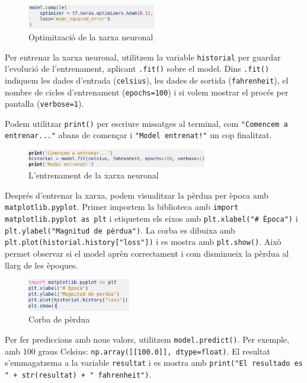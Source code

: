 \begin{figure}[H]
\centering
\includegraphics[width=0.5\textwidth]{./figures/4.png}
\caption{Optimització de la xarxa neuronal}
\end{figure}

Per entrenar la xarxa neuronal, utilitzem la variable \texttt{historial} per guardar l’evolució de l’entrenament, aplicant \texttt{.fit()} sobre el model. Dins \texttt{.fit()} indiquem les dades d’entrada (\texttt{celsius}), les dades de sortida (\texttt{fahrenheit}), el nombre de cicles d’entrenament (\texttt{epochs=100}) i si volem mostrar el procés per pantalla (\texttt{verbose=1}).

Podem utilitzar \texttt{print()} per escriure missatges al terminal, com \texttt{"\hspace{0truecm}Comencem a entrenar..."} abans de començar i \texttt{"Model entrenat!"} un cop finalitzat.

\begin{figure}[H]
\centering
\includegraphics[width=0.7\textwidth]{./figures/6.png}
\caption{L’entrenament de la xarxa neuronal}
\end{figure}

Després d’entrenar la xarxa, podem visualitzar la pèrdua per època amb \texttt{matplotlib.pyplot}. Primer importem la biblioteca amb \texttt{import matplotlib.pyplot as plt} i etiquetem els eixos amb \texttt{plt.xlabel("\# Època")} i \texttt{plt.ylabel("Magnitud de pèrdua")}. La corba es dibuixa amb \texttt{plt.plot(historial.history["loss"])} i es mostra amb \texttt{plt.show()}. Això permet observar si el model aprèn correctament i com disminueix la pèrdua al llarg de les èpoques.

\begin{figure}[H]
\centering
\includegraphics[width=0.4\textwidth]{./figures/7.png}
\caption{Corba de pèrdua}
\end{figure}

Per fer prediccions amb nous valors, utilitzem \texttt{model.predict()}. Per exemple, amb 100 graus Celsius: \texttt{np.array([[100.0]], dtype=float)}. El resultat s’emmagatzema a la variable \texttt{resultat} i es mostra amb \texttt{print("El resultado es " + str(resultat) + " fahrenheit")}.

